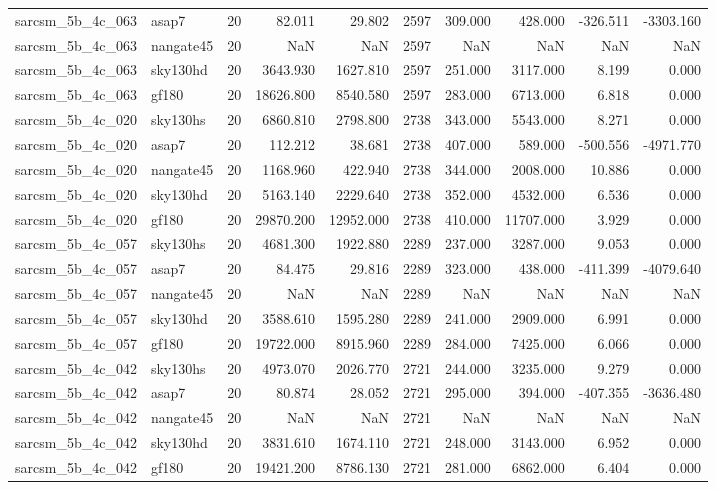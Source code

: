 \begin{tabular}{llrrrrrrrr}
sarcsm\_5b\_4c\_063 & asap7 & 20 & 82.011 & 29.802 & 2597 & 309.000 & 428.000 & -326.511 & -3303.160 \\
sarcsm\_5b\_4c\_063 & nangate45 & 20 & NaN & NaN & 2597 & NaN & NaN & NaN & NaN \\
sarcsm\_5b\_4c\_063 & sky130hd & 20 & 3643.930 & 1627.810 & 2597 & 251.000 & 3117.000 & 8.199 & 0.000 \\
sarcsm\_5b\_4c\_063 & gf180 & 20 & 18626.800 & 8540.580 & 2597 & 283.000 & 6713.000 & 6.818 & 0.000 \\
sarcsm\_5b\_4c\_020 & sky130hs & 20 & 6860.810 & 2798.800 & 2738 & 343.000 & 5543.000 & 8.271 & 0.000 \\
sarcsm\_5b\_4c\_020 & asap7 & 20 & 112.212 & 38.681 & 2738 & 407.000 & 589.000 & -500.556 & -4971.770 \\
sarcsm\_5b\_4c\_020 & nangate45 & 20 & 1168.960 & 422.940 & 2738 & 344.000 & 2008.000 & 10.886 & 0.000 \\
sarcsm\_5b\_4c\_020 & sky130hd & 20 & 5163.140 & 2229.640 & 2738 & 352.000 & 4532.000 & 6.536 & 0.000 \\
sarcsm\_5b\_4c\_020 & gf180 & 20 & 29870.200 & 12952.000 & 2738 & 410.000 & 11707.000 & 3.929 & 0.000 \\
sarcsm\_5b\_4c\_057 & sky130hs & 20 & 4681.300 & 1922.880 & 2289 & 237.000 & 3287.000 & 9.053 & 0.000 \\
sarcsm\_5b\_4c\_057 & asap7 & 20 & 84.475 & 29.816 & 2289 & 323.000 & 438.000 & -411.399 & -4079.640 \\
sarcsm\_5b\_4c\_057 & nangate45 & 20 & NaN & NaN & 2289 & NaN & NaN & NaN & NaN \\
sarcsm\_5b\_4c\_057 & sky130hd & 20 & 3588.610 & 1595.280 & 2289 & 241.000 & 2909.000 & 6.991 & 0.000 \\
sarcsm\_5b\_4c\_057 & gf180 & 20 & 19722.000 & 8915.960 & 2289 & 284.000 & 7425.000 & 6.066 & 0.000 \\
sarcsm\_5b\_4c\_042 & sky130hs & 20 & 4973.070 & 2026.770 & 2721 & 244.000 & 3235.000 & 9.279 & 0.000 \\
sarcsm\_5b\_4c\_042 & asap7 & 20 & 80.874 & 28.052 & 2721 & 295.000 & 394.000 & -407.355 & -3636.480 \\
sarcsm\_5b\_4c\_042 & nangate45 & 20 & NaN & NaN & 2721 & NaN & NaN & NaN & NaN \\
sarcsm\_5b\_4c\_042 & sky130hd & 20 & 3831.610 & 1674.110 & 2721 & 248.000 & 3143.000 & 6.952 & 0.000 \\
sarcsm\_5b\_4c\_042 & gf180 & 20 & 19421.200 & 8786.130 & 2721 & 281.000 & 6862.000 & 6.404 & 0.000 \\

\end{tabular}
